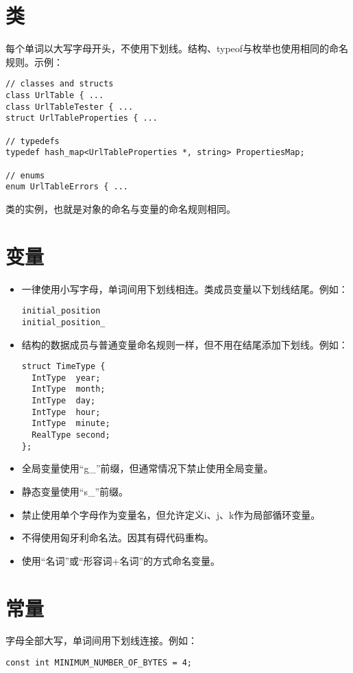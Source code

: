 \section{类}
每个单词以大写字母开头，不使用下划线。结构、typeof与枚举也使用相同的命名规则。示例：
\begin{verbatim}
// classes and structs
class UrlTable { ...
class UrlTableTester { ...
struct UrlTableProperties { ...

// typedefs
typedef hash_map<UrlTableProperties *, string> PropertiesMap;

// enums
enum UrlTableErrors { ...
\end{verbatim}

类的实例，也就是对象的命名与变量的命名规则相同。


\section{变量}
\begin{itemize}
  \item 一律使用小写字母，单词间用下划线相连。类成员变量以下划线结尾。例如：
  \begin{verbatim}
initial_position
initial_position_
  \end{verbatim}
  \item 结构的数据成员与普通变量命名规则一样，但不用在结尾添加下划线。例如：
  \begin{verbatim}
struct TimeType {
  IntType  year;
  IntType  month;
  IntType  day;
  IntType  hour;
  IntType  minute;
  RealType second;
};
  \end{verbatim}
  \item 全局变量使用“g\_”前缀，但通常情况下禁止使用全局变量。
  \item 静态变量使用“s\_”前缀。
  \item 禁止使用单个字母作为变量名，但允许定义i、j、k作为局部循环变量。
  \item 不得使用匈牙利命名法。因其有碍代码重构。
  \item 使用“名词”或“形容词+名词”的方式命名变量。
\end{itemize}


\section{常量}
字母全部大写，单词间用下划线连接。例如：
\begin{verbatim}
const int MINIMUM_NUMBER_OF_BYTES = 4;
\end{verbatim}

